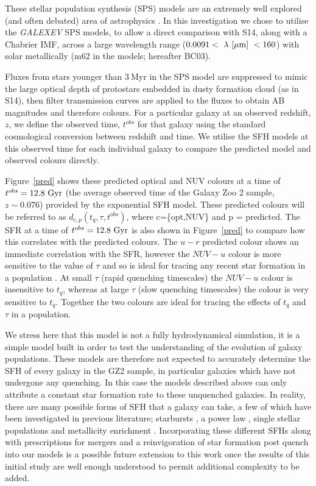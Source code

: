 These stellar population synthesis (SPS) models are an extremely well explored (and often debated) area of astrophysics \citep{Maraston05, Eminian08, CGW09, falkenberg09, Chen10, Kriek10, miner11, melbourne12}. In this investigation we chose to utilise the \citet{BC03} \emph{GALEXEV} SPS models, to allow a direct comparison with S14, along with a Chabrier \citep{chabrier03} IMF, across a large wavelength range ($0.0091 < ~\lambda~\rm{[\mu m]}~ < 160 $) with solar metallically (m62 in the \citet{BC03} models; hereafter BC03).


Fluxes from stars younger than $3~$Myr in the SPS model are suppressed to mimic the large optical depth of protostars embedded in dusty formation cloud (as in S14), then filter transmission curves are applied to the fluxes to obtain AB magnitudes and therefore colours.  For a particular galaxy at an observed redshift, $z$, we define the observed time, $t^{obs}$ for that galaxy using the standard cosmological conversion between redshift and time. We utilise the SFH models at this observed time for each individual galaxy to compare the predicted model and observed colours directly.


Figure~\ref{pred} shows these predicted optical and NUV colours at a time of $t^{obs} = 12.8 ~\rm{Gyr}$ (the average observed time of the Galaxy Zoo 2 sample, $z \sim 0.076$) provided by the exponential SFH model. These predicted colours will be referred to as $d_{c,p}(t_{q}, \tau, t^{obs})$, where c=\{opt,NUV\} and p = predicted. The SFR at a time of $t^{obs}=12.8~\rm{Gyr}$ is also shown in Figure~\ref{pred} to compare how this correlates with the predicted colours. The $u-r$ predicted colour shows an immediate correlation with the SFR, however the $NUV-u$ colour is more sensitive to the value of $\tau$ and so is ideal for tracing any recent star formation in a population . At small $\tau$ (rapid quenching timescales) the $NUV-u$ colour is insensitive to $t_{q}$, whereas at large $\tau$ (slow quenching timescales) the colour is very sensitive to $t_{q}$. Together the two colours are ideal for tracing the effects of $t_{q}$ and $\tau$ in a population. 

We stress here that this model is not a fully hydrodynamical simulation, it is a simple model built in order to test the understanding of the evolution of galaxy populations. These models are therefore not expected to accurately determine the SFH of every galaxy in the GZ2 sample, in particular galaxies which have not undergone any quenching. In this case the models described above can only attribute a constant star formation rate to these  unquenched galaxies. In reality, there are many possible forms of SFH that a galaxy can take, a few of which have been investigated in previous literature; starbursts \citep{Canalizo01}, a power law \citep{Glazebrook03}, single stellar populations \citep{Trager00, Sanchez06, Vazdekis10} and metallicity enrichment \citep{deLucia14}. Incorporating these different SFHs along with prescriptions for mergers and a reinvigoration of star formation post quench into our models is a possible future extension to this work once the results of this initial study are well enough understood to permit additional complexity to be added.

